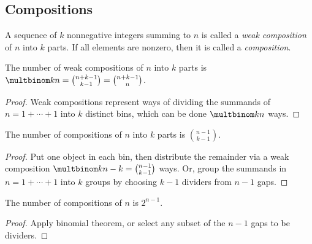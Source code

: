 \documentclass[a4paper]{article}
\begin{document}
\subsection{Compositions}

\begin{definition}
A sequence of $k$ nonnegative integers summing to $n$ is called a \emph{weak composition} of $n$ into $k$ parts. If all elements are nonzero, then it is called a \emph{composition}.
\end{definition}

\begin{theorem}
The number of weak compositions of $n$ into $k$ parts is $\multbinom kn=\binom{n+k-1}{k-1}=\binom{n+k-1}n$.

\begin{hl}
\begin{proof}
Weak compositions represent ways of dividing the summands of $n=1+\cdots+1$ into $k$ distinct bins, which can be done $\multbinom kn$ ways.
\end{proof}
\end{hl}
\end{theorem}

\begin{theorem}
The number of compositions of $n$ into $k$ parts is $\binom{n-1}{k-1}$.

\begin{hl}
\begin{proof}
Put one object in each bin, then distribute the remainder via a weak composition $\multbinom k{n-k}=\binom{n-1}{k-1}$ ways. Or, group the summands in $n=1+\cdots+1$ into $k$ groups by choosing $k-1$ dividers from $n-1$ gaps.
\end{proof}
\end{hl}
\end{theorem}

\begin{theorem}
The number of compositions of $n$ is $2^{n-1}$.

\begin{hl}
\begin{proof}
Apply binomial theorem, or select any subset of the $n-1$ gaps to be dividers.
\end{proof}
\end{hl}
\end{theorem}
\end{document}
